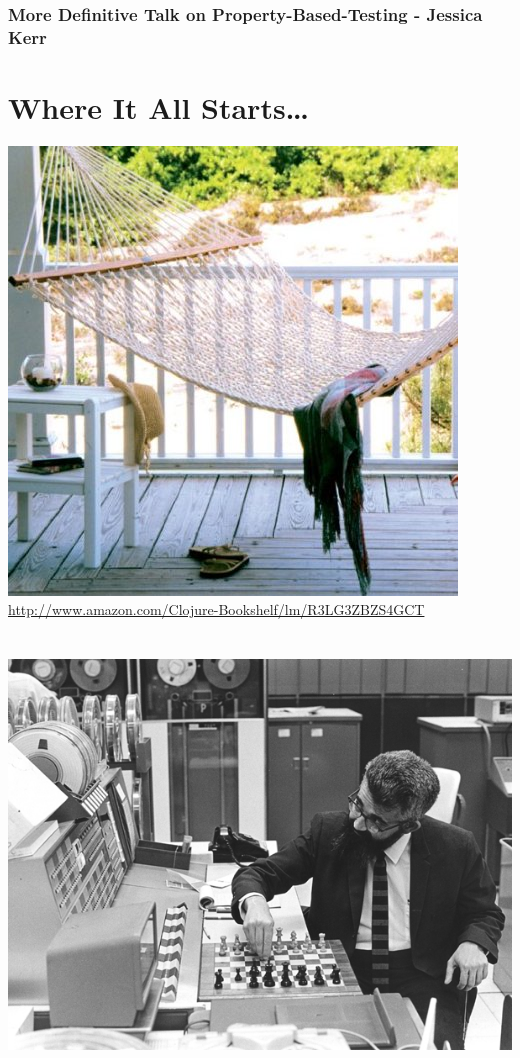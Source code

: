 \documentclass[11pt]{article}
\begin{document}
\subsubsection{More Definitive Talk on Property-Based-Testing - Jessica Kerr}
\label{sec-4-3-1}
\section{Where It All Starts\ldots{}}
\label{sec-5}

\includegraphics[width=.9\linewidth]{../images/hammock.jpg}
\url{http://www.amazon.com/Clojure-Bookshelf/lm/R3LG3ZBZS4GCT}
\section{\includegraphics[width=.9\linewidth]{../images/mc.jpg}}
\label{sec-6}
\end{document}
